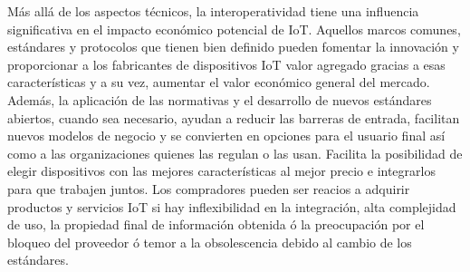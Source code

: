 Más allá de los aspectos técnicos, la interoperatividad tiene una influencia significativa en el impacto económico potencial de IoT. Aquellos marcos comunes, estándares y protocolos que tienen bien definido pueden fomentar la innovación y proporcionar a los fabricantes de dispositivos IoT valor agregado gracias a esas características y a su vez, aumentar el valor económico general del mercado.\\

Además, la aplicación de las normativas y el desarrollo de nuevos estándares abiertos, cuando sea necesario, ayudan a reducir las barreras de entrada, facilitan nuevos modelos de negocio y se convierten en opciones para el usuario final así como a las organizaciones quienes las regulan o las usan. Facilita la posibilidad de elegir dispositivos con las mejores características al mejor precio e integrarlos para que trabajen juntos. Los compradores pueden ser reacios a adquirir productos y servicios IoT si hay inflexibilidad en la integración, alta complejidad de uso, la propiedad final de información obtenida ó la preocupación por el bloqueo del proveedor ó temor a la obsolescencia debido al cambio de los estándares\cite{iotInternetSociety}.\\

